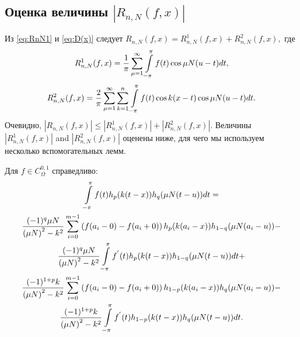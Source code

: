 %	

\subsection{Оценка величины $\left|R_{n,N}(f,x)\right|$}

Из \eqref{eq:RnN1} и \eqref{eq:D(x)} следует
$
R_{n,N}(f,x)=R_{n,N}^{1}(f,x)+R_{n,N}^{2}(f,x),
$
где
\begin{equation*}
R_{n,N}^{1}(f,x)=\frac{1}{\pi}\sum_{\mu=1}^{\infty}\intop_{-\pi}^{\pi}f(t)\cos\mu N(u-t)dt,\label{eq:R1_formula1}
\end{equation*}
\begin{equation}
R_{n,N}^{2}(f,x)=\frac{2}{\pi}\sum_{\mu=1}^{\infty}\sum_{k=1}^{n}\intop_{-\pi}^{\pi}f(t)\cos k(x-t)\cos\mu N(u-t)dt.\label{eq:R2_formula1}
\end{equation}
Очевидно,
$
\left|R_{n,N}(f,x)\right| \leq \left|R_{n,N}^{1}(f,x)\right| + \left|R_{n,N}^{2}(f,x)\right|
$. Величины $\left|R_{n,N}^{1}(f,x)\right|$ and $\left|R_{n,N}^{2}(f,x)\right|$ оценены ниже, для чего мы используем несколько вспомогательных лемм.

\begin{lemma}\label{hlemma}
	Для $f \in C_\Omega^{0,1}$ справедливо:
	\begin{multline}\label{hlemma_eq1}
	\intop_{-\pi}^{\pi}f(t)h_{p}(k(t-x))h_{q}(\mu N(t-u))dt= \\
	\frac{(-1)^{q}\mu N}{\left(\mu N\right)^{2}-k^{2}}\sum_{i=0}^{m-1}\left(f(a_{i}-0)-f(a_{i}+0)\right)h_{p}(k(a_{i}-x))h_{1-q}(\mu N(a_{i}-u))-\\
	\frac{(-1)^{q}\mu N}{\left(\mu N\right)^{2}-k^{2}}\intop_{-\pi}^{\pi}f^{'}(t)h_{p}(k(t-x))h_{1-q}(\mu N(t-u))dt+\\
	\frac{(-1)^{1+p}k}{\left(\mu N\right)^{2}-k^{2}}\sum_{i=0}^{m-1}\left(f(a_{i}-0)-f(a_{i}+0)\right)h_{1-p}(k(a_{i}-x))h_{q}(\mu N(a_{i}-u))-\\
	\frac{(-1)^{1+p}k}{\left(\mu N\right)^{2}-k^{2}}\intop_{-\pi}^{\pi}f^{'}(t)h_{1-p}(k(t-x))h_{q}(\mu N(t-u))dt.
	\end{multline}
\end{lemma}

